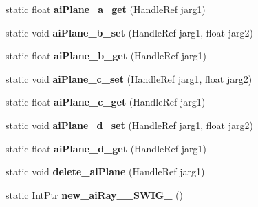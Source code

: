 \begin{DoxyCompactItemize}
\item 
\hypertarget{class_assimp_p_i_n_v_o_k_e_ad87786f4f543a6acd148f50c09869ec6}{static float {\bfseries ai\+Plane\+\_\+a\+\_\+get} (Handle\+Ref jarg1)}\label{class_assimp_p_i_n_v_o_k_e_ad87786f4f543a6acd148f50c09869ec6}

\item 
\hypertarget{class_assimp_p_i_n_v_o_k_e_ac188a939b498c926f05dfe638e968015}{static void {\bfseries ai\+Plane\+\_\+b\+\_\+set} (Handle\+Ref jarg1, float jarg2)}\label{class_assimp_p_i_n_v_o_k_e_ac188a939b498c926f05dfe638e968015}

\item 
\hypertarget{class_assimp_p_i_n_v_o_k_e_a67774cc8a198d9d4c43fec8c7270f0b3}{static float {\bfseries ai\+Plane\+\_\+b\+\_\+get} (Handle\+Ref jarg1)}\label{class_assimp_p_i_n_v_o_k_e_a67774cc8a198d9d4c43fec8c7270f0b3}

\item 
\hypertarget{class_assimp_p_i_n_v_o_k_e_a1ba079416726cc0426835bf95c6563e6}{static void {\bfseries ai\+Plane\+\_\+c\+\_\+set} (Handle\+Ref jarg1, float jarg2)}\label{class_assimp_p_i_n_v_o_k_e_a1ba079416726cc0426835bf95c6563e6}

\item 
\hypertarget{class_assimp_p_i_n_v_o_k_e_a14a3d4691a1376b452032192ba106639}{static float {\bfseries ai\+Plane\+\_\+c\+\_\+get} (Handle\+Ref jarg1)}\label{class_assimp_p_i_n_v_o_k_e_a14a3d4691a1376b452032192ba106639}

\item 
\hypertarget{class_assimp_p_i_n_v_o_k_e_ad39bccad44a2acb5f30af2e6b120c352}{static void {\bfseries ai\+Plane\+\_\+d\+\_\+set} (Handle\+Ref jarg1, float jarg2)}\label{class_assimp_p_i_n_v_o_k_e_ad39bccad44a2acb5f30af2e6b120c352}

\item 
\hypertarget{class_assimp_p_i_n_v_o_k_e_abe3599893d316895587f4c975056396f}{static float {\bfseries ai\+Plane\+\_\+d\+\_\+get} (Handle\+Ref jarg1)}\label{class_assimp_p_i_n_v_o_k_e_abe3599893d316895587f4c975056396f}

\item 
\hypertarget{class_assimp_p_i_n_v_o_k_e_ae51f84ff9ea41de966091c10f7fd9f6e}{static void {\bfseries delete\+\_\+ai\+Plane} (Handle\+Ref jarg1)}\label{class_assimp_p_i_n_v_o_k_e_ae51f84ff9ea41de966091c10f7fd9f6e}

\item 
\hypertarget{class_assimp_p_i_n_v_o_k_e_aff03d4328acfd70ba6732e41330edd90}{static Int\+Ptr {\bfseries new\+\_\+ai\+Ray\+\_\+\+\_\+\+S\+W\+I\+G\+\_} ()}\label{class_assimp_p_i_n_v_o_k_e_aff03d4328acfd70ba6732e41330edd90}


\end{DoxyCompactItemize}
